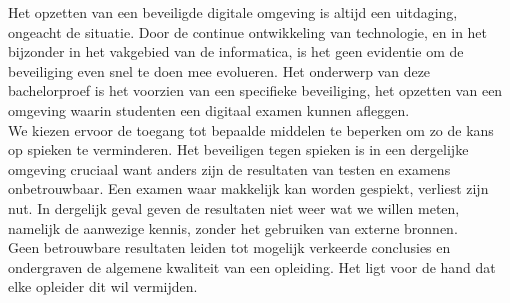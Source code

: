 
%
%

%

Het opzetten van een beveiligde digitale omgeving is altijd een uitdaging, ongeacht de situatie. Door de continue ontwikkeling van technologie, en in het bijzonder in het vakgebied van de informatica, is het geen evidentie om de beveiliging even snel te doen mee evolueren. Het onderwerp van deze bachelorproef is het voorzien van een specifieke beveiliging, het opzetten van een omgeving waarin studenten een digitaal examen kunnen afleggen. \\

We kiezen ervoor de toegang tot bepaalde middelen te beperken om zo de kans op spieken te verminderen. Het beveiligen tegen spieken is in een dergelijke omgeving cruciaal want anders zijn de resultaten van testen en examens onbetrouwbaar. Een examen waar makkelijk kan worden gespiekt, verliest zijn nut. In dergelijk geval geven de resultaten niet weer wat we willen meten, namelijk de aanwezige kennis, zonder het gebruiken van externe bronnen. \\
Geen betrouwbare resultaten leiden tot mogelijk verkeerde conclusies en ondergraven de algemene kwaliteit van een opleiding. Het ligt voor de hand dat elke opleider dit wil vermijden. \\

